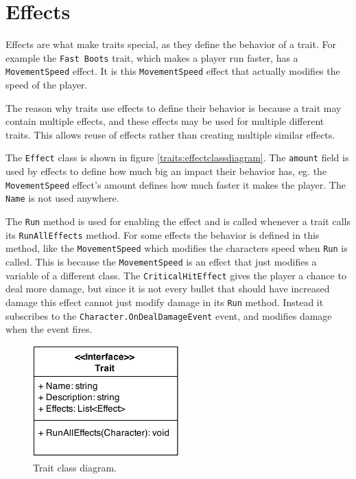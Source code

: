 \section{Effects}
\label{sec:modules:effects}

Effects are what make traits special, as they define the behavior of a trait.
For example the \texttt{Fast Boots} trait, which makes a player run faster, has a \texttt{MovementSpeed} effect.
It is this \texttt{MovementSpeed} effect that actually modifies the speed of the player.

The reason why traits use effects to define their behavior is because a trait may contain multiple effects, and these effects may be used for multiple different traits.
This allows reuse of effects rather than creating multiple similar effects.

The \texttt{Effect} class is shown in figure \ref{traits:effectclassdiagram}.
The \texttt{amount} field is used by effects to define how much big an impact their behavior has, eg. the \texttt{MovementSpeed} effect's amount defines how much faster it makes the player.
The \texttt{Name} is not used anywhere.

The \texttt{Run} method is used for enabling the effect and is called whenever a trait calls its \texttt{RunAllEffects} method.
For some effects the behavior is defined in this method, like the \texttt{MovementSpeed} which modifies the characters speed when \texttt{Run} is called.
This is because the \texttt{MovementSpeed} is an effect that just modifies a variable of a different class.
The \texttt{CriticalHitEffect} gives the player a chance to deal more damage, but since it is not every bullet that should have increased damage this effect cannot just modify damage in its \texttt{Run} method.
Instead it subscribes to the \texttt{Character.OnDealDamageEvent} event, and modifies damage when the event fires.

\begin{figure}
\centering
\includegraphics[width=0.5\textwidth]{figures/traits/TraitClassDiagram.png}
\caption{Trait class diagram.}
\label{traits:traitclassdiagram}
\end{figure}

